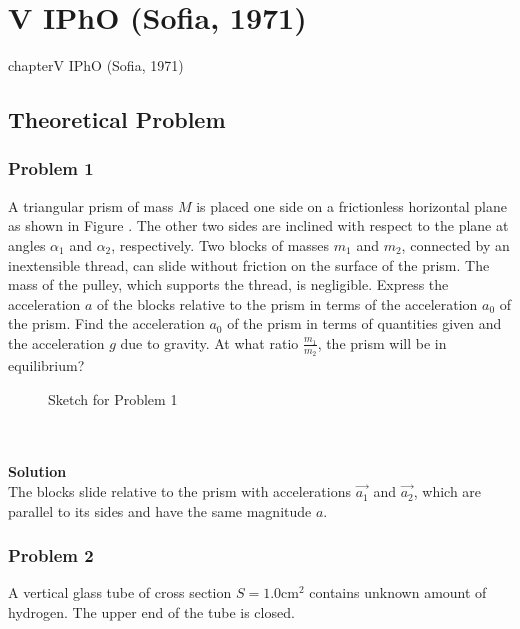 \documentclass[12pt,a4paper]{book}
\begin{document}
\chapter*{V IPhO (Sof\mbox{}ia, 1971)}
{chapter}{V IPhO (Sof\mbox{}ia, 1971)}
\section*{Theoretical Problem}
	\subsection*{Problem 1}
	A triangular prism of mass $M$ is placed one side on a frictionless horizontal plane as shown in Figure \label{sketch_5_1_1}. The other two sides are inclined with respect to the plane at angles $\alpha_1$ and $\alpha_2$, respectively. Two blocks of masses $m_1$ and $m_2$, connected by an inextensible thread, can slide without friction on the surface of the prism. The mass of the pulley, which supports the thread, is negligible. Express the acceleration $a$ of the blocks relative to the prism in terms of the acceleration $a_0$ of the prism. Find the acceleration $a_0$ of the prism in terms of quantities given and the acceleration $g$ due to gravity. At what ratio $\frac{m_1}{m_2}$, the prism will be in equilibrium?
	\begin{figure}
		[!hbtp]
		\centering
		\caption{Sketch for Problem 1}
	\end{figure}\\ \\
	\textbf{Solution}\\
	The blocks slide relative to the prism with accelerations $\vec{a_1}$ and $\vec{a_2}$, which are parallel to its sides and have the same magnitude $a$.
	\subsection*{Problem 2}
	A vertical glass tube of cross section $S=1.0\text{cm}^2$ contains unknown amount of hydrogen. The upper end of the tube is closed.
\end{document}
